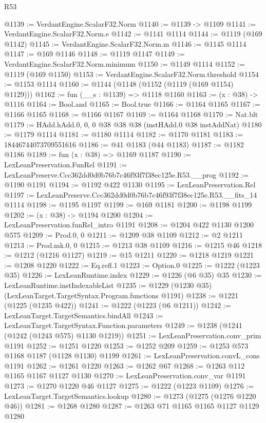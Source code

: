 \begin{lexlean}{R53}
\begin{coremodule}
@1139 := VerdantEngine.ScalarF32.Norm
@1140 := @1139 -> @1109
@1141 := VerdantEngine.ScalarF32.Norm.e
@1142 := @1141 @1114
@1144 := @1119 (@169 @1142)
@1145 := VerdantEngine.ScalarF32.Norm.m
@1146 := @1145 @1114
@1147 := @169 @1146
@1148 := @1119 @1147
@1149 := VerdantEngine.ScalarF32.Norm.minimum
@1150 := @1149 @1114
@1152 := @1119 (@169 @1150)
@1153 := VerdantEngine.ScalarF32.Norm.threshold
@1154 := @1153 @1114
@1160 := @1144 (@1148 (@1152 (@1119 (@169 @1154) @1129)))
@1162 := fun (__s : @1139) => @1118 @1160
@1163 := (x : @38) -> @1116
@1164 := Bool.and
@1165 := Bool.true
@1166 := @1164 @1165
@1167 := @1166 @1165
@1168 := @1166 @1167
@1169 := @1164 @1168
@1170 := Nat.blt
@1179 := HAdd.hAdd.{0, 0, 0} @38 @38 @38 (instHAdd.{0} @38 instAddNat)
@1180 := @1179 @1114
@1181 := @1180 @1114
@1182 := @1170 @1181
@1183 := 18446744073709551616
@1186 := @41 @1183 (@44 @1183)
@1187 := @1182 @1186
@1189 := fun (x : @38) => @1169 @1187
@1190 := LexLeanPreservation.FunRel
@1191 := LexLeanPreserve.Ccc362dd0d0b76b7c46f93f7f38ec125e.R53.__prog
@1192 := @1190 @1191
@1194 := @1192 @422 @1130
@1195 := LexLeanPreservation.Rel
@1197 := LexLeanPreserve.Ccc362dd0d0b76b7c46f93f7f38ec125e.R53.__fits_14 @1114
@1198 := @1195 @1197
@1199 := @169 @1181
@1200 := @1198 @1199
@1202 := (x : @38) -> @1194 @1200
@1204 := LexLeanPreservation.funRel_intro @1191
@1208 := @1204 @422 @1130 @1200 @575
@1209 := Prod.{0, 0}
@1211 := @1209 @38 @1109
@1212 := @2 @1211
@1213 := Prod.mk.{0, 0}
@1215 := @1213 @38 @1109
@1216 := @1215 @46
@1218 := @1212 (@1216 @1127)
@1219 := @15 @1211
@1220 := @1218 @1219
@1221 := @1208 @1220
@1222 := Eq.refl.{1}
@1223 := Option.{0}
@1225 := @1222 (@1223 @35)
@1226 := LexLeanRuntime.index
@1229 := @1226 (@6 @35) @35
@1230 := LexLeanRuntime.instIndexableList
@1235 := @1229 (@1230 @35) (LexLeanTarget.TargetSyntax.Program.functions @1191)
@1238 := @1221 (@1225 (@1235 @422))
@1241 := @1222 (@1223 (@6 @1211))
@1242 := LexLeanTarget.TargetSemantics.bindAll
@1243 := LexLeanTarget.TargetSyntax.Function.parameters
@1249 := @1238 (@1241 (@1242 (@1243 @575) @1130 @1219))
@1251 := LexLeanPreservation.conv_prim @1191
@1252 := @1251 @1220
@1253 := @1252 @209
@1259 := @1253 @573 @1168 @1187 (@1128 @1130) @1199
@1261 := LexLeanPreservation.convL_cons @1191
@1262 := @1261 @1220
@1263 := @1262 @67
@1268 := @1263 @112 @1165 @1167 @1127 @1130
@1270 := LexLeanPreservation.conv_var @1191
@1273 := @1270 @1220 @46 @1127
@1275 := @1222 (@1223 @1109)
@1276 := LexLeanTarget.TargetSemantics.lookup
@1280 := @1273 (@1275 (@1276 @1220 @46))
@1281 := @1268 @1280
@1287 := @1263 @71 @1165 @1165 @1127 @1129 @1280

\end{coremodule}
\end{lexlean}
